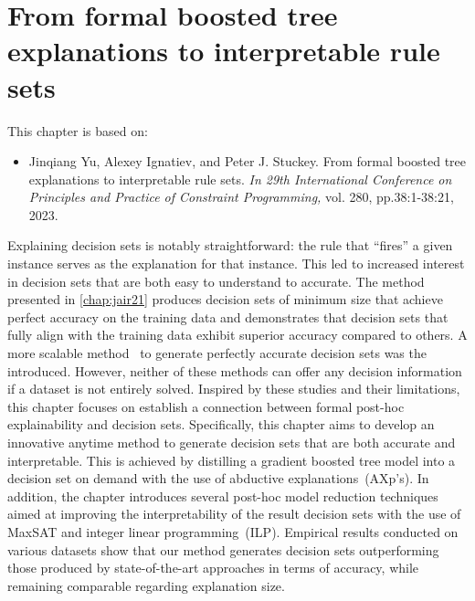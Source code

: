 \chapter{From formal boosted tree explanations to
interpretable rule sets} \label{chap:cp23}

This chapter is based on:
\begin{itemize}
	\item Jinqiang Yu, Alexey Ignatiev, and Peter J. Stuckey. From formal boosted tree explanations to
interpretable rule sets. \emph{In 29th International Conference on Principles and Practice of
	Constraint Programming,} vol. 280, pp.38:1-38:21, 2023.
\end{itemize}

Explaining decision sets is notably straightforward: the rule that ``fires'' a given instance
serves as the explanation for that instance.
%
This led to increased interest in decision sets that are both easy to understand
to accurate.
%
The method presented in \autoref{chap:jair21} produces decision sets of minimum size that achieve
perfect accuracy on the training data and demonstrates that decision sets that fully align with the
training data exhibit superior accuracy compared to others.
%
A more scalable method~\cite{ilsms-aaai21} to generate perfectly accurate decision sets was the
introduced.
%
However, neither of these methods can offer any decision information if a dataset is not entirely solved.
%
Inspired by these studies and their limitations, this chapter focuses on establish a connection between 
formal post-hoc explainability and decision sets.
%
Specifically, this chapter aims to develop an innovative anytime method to generate decision sets that are 
both accurate and interpretable. 
%
This is achieved by distilling a gradient boosted tree model into a decision set on demand with 
the use of abductive explanations~(AXp's).
%
In addition, the chapter introduces several post-hoc model reduction techniques aimed at
improving the interpretability of the result decision sets with the use of MaxSAT and 
integer linear programming~(ILP).
%
Empirical results conducted on various datasets show that our method 
generates decision sets outperforming those produced by state-of-the-art approaches in terms of
accuracy, while remaining comparable regarding explanation size.


%
